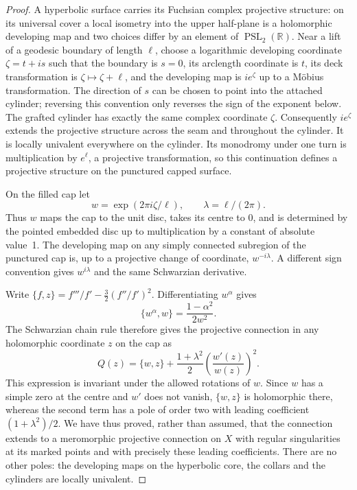 \begin{proof}
A hyperbolic surface carries its Fuchsian complex projective structure:
on its universal cover a local isometry into the upper half-plane is a
holomorphic developing map and two choices differ by an element of
$\operatorname{PSL}_2(\mathbb R)$. Near a lift of a geodesic boundary
of length $\ell$, choose a logarithmic developing coordinate
$\zeta=t+is$ such that the boundary is $s=0$, its arclength coordinate
is $t$, its deck transformation is $\zeta\mapsto\zeta+\ell$, and
the developing map is $i e^{\zeta}$ up to a M\"obius transformation.
The direction of $s$ can be chosen to point into the attached cylinder;
reversing this convention only reverses the sign of the exponent below.
The grafted cylinder has exactly the same complex coordinate $\zeta$.
Consequently $i e^{\zeta}$ extends the projective structure across the
seam and throughout the cylinder. It is locally univalent everywhere
on the cylinder. Its monodromy under one turn is multiplication by
$e^{\ell}$, a projective transformation, so this continuation defines
a projective structure on the punctured capped surface.

On the filled cap let
\[
 w=\exp(2\pi i\zeta/\ell),\qquad
 \lambda=\ell/(2\pi).
\]
Thus $w$ maps the cap to the unit disc, takes its centre to $0$, and
is determined by the pointed embedded disc up to multiplication by a
constant of absolute value~1. The developing map on any simply
connected subregion of the punctured cap is, up to a projective change
of coordinate, $w^{-i\lambda}$. A different sign convention gives
$w^{i\lambda}$ and the same Schwarzian derivative.

Write $\{f,z\}=f'''/f'-\frac32(f''/f')^2$. Differentiating
$w^\alpha$ gives
\[
 \{w^\alpha,w\}=\frac{1-\alpha^2}{2w^2}.
\]
The Schwarzian chain rule therefore gives the projective connection
in any holomorphic coordinate $z$ on the cap as
\begin{equation}\label{A:cap-projective-connection}
 Q(z)=\{w,z\}+
 \frac{1+\lambda^2}{2}\left(\frac{w'(z)}{w(z)}\right)^2.
\end{equation}
This expression is invariant under the allowed rotations of $w$.
Since $w$ has a simple zero at the centre and $w'$ does not vanish,
$\{w,z\}$ is holomorphic there, whereas the second term has a pole
of order two with leading coefficient $(1+\lambda^2)/2$. We have
thus proved, rather than assumed, that the connection extends to a
meromorphic projective connection on $X$ with regular singularities
at its marked points and with precisely these leading coefficients.
There are no other poles: the developing maps on the hyperbolic core,
the collars and the cylinders are locally univalent.


\end{proof}
